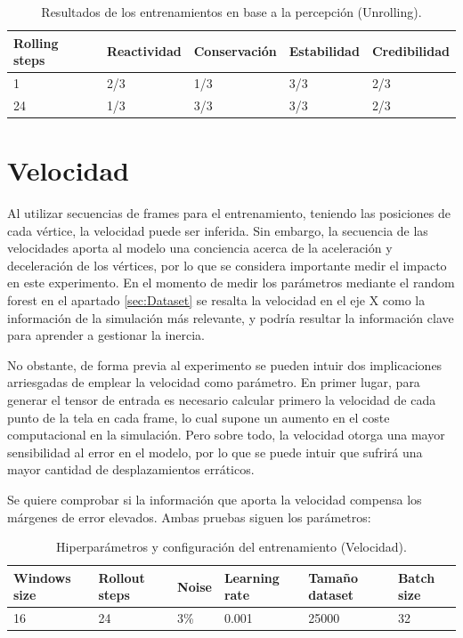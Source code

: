 \begin{table}[H]
    \begin{center}
        \begin{tabular}{ | m{2cm} |  m{2.6cm} | m{2.8cm} | m{2.6cm} | m{2.7cm} |}
        \hline \textbf{Rolling steps} & \textbf{Reactividad} & \textbf{Conservación} & \textbf{Estabilidad} & \textbf{Credibilidad} \\ \hline
            1 & 2/3 & 1/3 & 3/3 & 2/3 \\ \hline
            24 & 1/3 & 3/3 & 3/3 & 2/3 \\ \hline
        \end{tabular}
    \end{center}
    \caption{Resultados de los entrenamientos en base a la percepción (Unrolling).}
    \label{tab:visResultsUnfold}
\end{table}

\section{Velocidad}
Al utilizar secuencias de frames para el entrenamiento, teniendo las posiciones de cada vértice, la velocidad puede ser inferida. Sin embargo, la secuencia de las velocidades aporta al modelo una conciencia acerca de la aceleración y deceleración de los vértices, por lo que se considera importante medir el impacto en este experimento. En el momento de medir los parámetros mediante el random forest en el apartado \ref{sec:Dataset} se resalta la velocidad en el eje X como la información de la simulación más relevante, y podría resultar la información clave para aprender a gestionar la inercia.

No obstante, de forma previa al experimento se pueden intuir dos implicaciones arriesgadas de emplear la velocidad como parámetro. En primer lugar, para generar el tensor de entrada es necesario calcular primero la velocidad de cada punto de la tela en cada frame, lo cual supone un aumento en el coste computacional en la simulación. Pero sobre todo, la velocidad otorga una mayor sensibilidad al error en el modelo, por lo que se puede intuir que sufrirá una mayor cantidad de desplazamientos erráticos.

Se quiere comprobar si la información que aporta la velocidad compensa los márgenes de error elevados.
Ambas pruebas siguen los parámetros:
\begin{table}[H]
    \begin{center}
        \begin{tabular}{ | m{2.2cm} | m{2cm} | m{1.2cm} | m{2.1cm} | m{2.4cm} | m{2.2cm} | }
        \hline \textbf{Windows size} & \textbf{Rollout steps} & \textbf{Noise} & \textbf{Learning rate} & \textbf{Tamaño dataset} & \textbf{Batch size} \\ \hline
            16 & 24 & 3\% & 0.001 & 25000 & 32 \\ \hline
        \end{tabular}
            \end{center}
    \caption{Hiperparámetros y configuración del entrenamiento (Velocidad).}
    \label{tab:randomTrainingVel}
\end{table}

